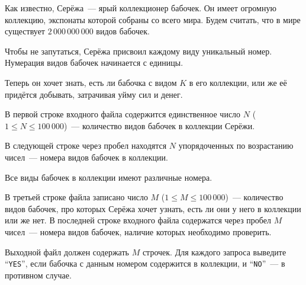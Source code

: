 Как известно, Серёжа~--- ярый коллекционер бабочек.  Он имеет
огромную коллекцию, экспонаты которой собраны со всего мира.  Будем считать,
что в мире существует $2\,000\,000\,000$ видов бабочек. 

Чтобы не запутаться, Серёжа присвоил каждому виду уникальный номер.
Нумерация видов бабочек начинается с единицы.

Теперь он хочет знать, есть ли бабочка с видом $K$ в его коллекции, или же её
придётся добывать, затрачивая уйму сил и денег.

\InputFile

В первой строке входного файла содержится единственное число $N$ ($1 \leqslant
N \leqslant 100\,000$)~--- количество видов бабочек в коллекции Серёжи. 

В следующей строке через пробел находятся $N$ упорядоченных по возрастанию
чисел~--- номера видов бабочек в коллекции. 

Все виды бабочек в коллекции имеют различные номера.

В третьей строке файла записано число $M$ ($1 \leqslant M \leqslant
100\,000$)~--- количество видов бабочек, про которых Серёжа хочет узнать, есть
ли они у него в коллекции или же нет. В последней строке входного файла
содержатся через пробел $M$ чисел~--- номера видов бабочек, наличие которых
необходимо проверить.

\OutputFile

Выходной файл должен содержать $M$ строчек. Для каждого запроса выведите
``\texttt{YES}'', если бабочка с данным номером содержится в коллекции,
и ``\texttt{NO}''~--- в противном случае.

\SAMPLES

